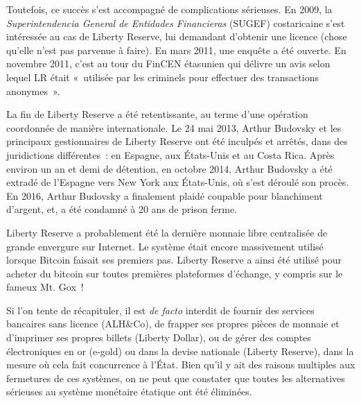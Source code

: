 Toutefois, ce succès s'est accompagné de complications sérieuses. En 2009, la \emph{Superintendencia General de Entidades Financieras} (SUGEF) costaricaine s'est intéressée au cas de Liberty Reserve, lui demandant d'obtenir une licence (chose qu'elle n'est pas parvenue à faire). En mars 2011, une enquête a été ouverte. En novembre 2011, c'est au tour du FinCEN étasunien qui délivre un avis selon lequel LR était «~utilisée par les criminels pour effectuer des transactions anonymes~».

La fin de Liberty Reserve a été retentissante, au terme d'une opération coordonnée de manière internationale. Le 24 mai 2013, Arthur Budovsky et les principaux gestionnaires de Liberty Reserve ont été inculpés et arrêtés, dans des juridictions différentes~: en Espagne, aux États-Unis et au Costa Rica. Après environ un an et demi de détention, en octobre 2014, Arthur Budovsky a été extradé de l'Espagne vers New York aux États-Unis, où s'est déroulé son procès. En 2016, Arthur Budovsky a finalement plaidé coupable pour blanchiment d'argent, et, a été condamné à 20 ans de prison ferme.

Liberty Reserve a probablement été la dernière monnaie libre centralisée de grande envergure sur Internet. Le système était encore massivement utilisé lorsque Bitcoin faisait ses premiers pas. Liberty Reserve a ainsi été utilisé pour acheter du bitcoin sur toutes premières plateformes d'échange, y compris sur le fameux Mt. Gox~!


Si l'on tente de récapituler, il est \emph{de facto} interdit de fournir des services bancaires sans licence (ALH\&Co), de frapper ses propres pièces de monnaie et d'imprimer ses propres billets (Liberty Dollar), ou de gérer des comptes électroniques en or (e-gold) ou dans la devise nationale (Liberty Reserve), dans la mesure où cela fait concurrence à l'État. Bien qu'il y ait des raisons multiples aux fermetures de ces systèmes, on ne peut que constater que toutes les alternatives sérieuses au système monétaire étatique ont été éliminées.

